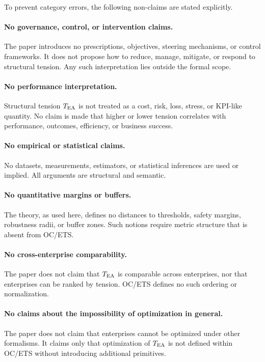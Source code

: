To prevent category errors, the following non-claims are stated explicitly.

\paragraph{No governance, control, or intervention claims.}
The paper introduces no prescriptions, objectives, steering mechanisms, or
control frameworks. It does not propose how to reduce, manage, mitigate, or
respond to structural tension. Any such interpretation lies outside the
formal scope.

\paragraph{No performance interpretation.}
Structural tension $T_{\mathrm{EA}}$ is not treated as a cost, risk, loss, stress, or
KPI-like quantity. No claim is made that higher or lower tension correlates
with performance, outcomes, efficiency, or business success.

\paragraph{No empirical or statistical claims.}
No datasets, measurements, estimators, or statistical inferences are used
or implied. All arguments are structural and semantic.

\paragraph{No quantitative margins or buffers.}
The theory, as used here, defines no distances to thresholds, safety
margins, robustness radii, or buffer zones. Such notions require metric
structure that is absent from OC/ETS.

\paragraph{No cross-enterprise comparability.}
The paper does not claim that $T_{\mathrm{EA}}$ is comparable across enterprises, nor
that enterprises can be ranked by tension. OC/ETS defines no such ordering
or normalization.

\paragraph{No claims about the impossibility of optimization in general.}
The paper does not claim that enterprises cannot be optimized under other
formalisms. It claims only that optimization of $T_{\mathrm{EA}}$ is not defined within
OC/ETS without introducing additional primitives.

